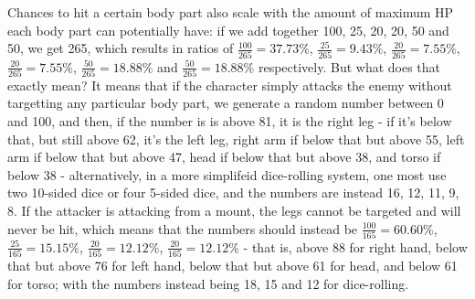 \documentclass[tikz,openany,11pt,a4paper]{book}
\begin{document}
Chances to hit a certain body part also scale with the amount of maximum HP each body part can potentially have: if we add together 100, 25, 20, 20, 50 and 50, we get 265, which results in ratios of $ \frac{100}{265}=37.73\% $, $ \frac{25}{265}=9.43\% $, $ \frac{20}{265}=7.55\% $, $ \frac{20}{265}=7.55\% $, $ \frac{50}{265}=18.88\% $ and $ \frac{50}{265}=18.88\% $ respectively. But what does that exactly mean? It means that if the character simply attacks the enemy without targetting any particular body part, we generate a random number between 0 and 100, and then, if the number is is above 81, it is the right leg - if it's below that, but still above 62, it's the left leg, right arm if below that but above 55, left arm if below that but above 47, head if below that but above 38, and torso if below 38 - alternatively, in a more simplifeid dice-rolling system, one most use two 10-sided dice or four 5-sided dice, and the numbers are instead 16, 12, 11, 9, 8.\newline
If the attacker is attacking from a mount, the legs cannot be targeted and will never be hit, which means that the numbers should instead be $ \frac{100}{165}=60.60\% $, $ \frac{25}{165}=15.15\% $, $ \frac{20}{165}=12.12\% $, $ \frac{20}{165}=12.12\% $ - that is, above 88 for right hand, below that but above 76 for left hand, below that but above 61 for head, and below 61 for torso; with the numbers instead being 18, 15 and 12 for dice-rolling.
\end{document}
